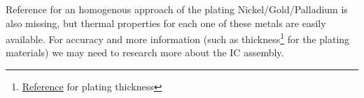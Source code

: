 \documentclass[final]{cubedoc}
\begin{document}
	
	Reference for an homogenous approach of the plating Nickel/Gold/Palladium is also missing, but thermal properties for each one of these metals are easily available. For accuracy and more information (such as thickness\footnote{ \href{https://web.archive.org/web/20200818132539/https://www.idt.com/us/en/support/knowledge-base/what-are-specifications-terminal-plating-plating-methods-and-plating-thickness-any-idt-part}{Reference} for plating thickness} for the plating materials) we may need to research more about the IC assembly.
	
	\begin{table}[h!]
		\centering
		\caption{Material Bulk properties of plating-metals}
		\label{tab:plate}
	\end{table}
	
	
\end{document}
